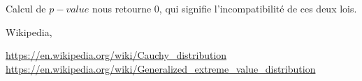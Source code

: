 \documentclass[12pt,a4paper,titlepage]{article}
\numberwithin{equation}{section}
\begin{document}
Calcul de $p-value$ nous retourne $0$, qui signifie l'incompatibilité de ces deux lois.
\clearpage

\begin{thebibliography}{3}

Wikipedia,

\url{https://en.wikipedia.org/wiki/Cauchy_distribution}
\url{https://en.wikipedia.org/wiki/Generalized_extreme_value_distribution}

\end{thebibliography}
\end{document}
